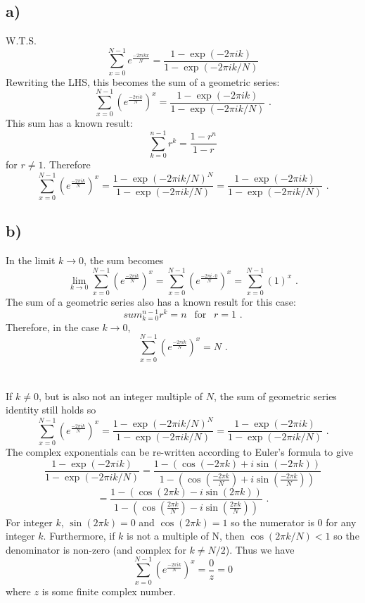 \documentclass{article}
\newcommand{\<}[1]{\left\langle #1 \right\rangle }
\begin{document}
\section{}
\subsection{a)}
W.T.S.
\[\sum_{x=0}^{N-1} e^{\frac{-2\pi i k x}{N}} = \frac{1- \exp(-2\pi ik)}{1- \exp(-2\pi i k / N)}\]
Rewriting the LHS, this becomes the sum of a geometric series:
\[\sum_{x=0}^{N-1} \left(e^{\frac{-2\pi i k}{N}}\right)^x = \frac{1- \exp(-2\pi ik)}{1- \exp(-2\pi i k / N)} \text{ .}\]
This sum has a known result:
\[\sum_{k=0}^{n-1} r^k = \frac{1 - r^n}{1 - r} \]
for $r \neq 1$. Therefore
\[\sum_{x=0}^{N-1} \left(e^{\frac{-2\pi i k}{N}}\right)^x = \frac{1- \exp(-2\pi ik/N)^N}{1- \exp(-2\pi i k / N)} = \frac{1- \exp(-2\pi ik)}{1- \exp(-2\pi i k / N)} \text{ .}\]

\subsection{b)}
In the limit $k \to 0$, the sum becomes
\[\lim_{k\to 0} \sum_{x=0}^{N-1} \left(e^{\frac{-2\pi i k}{N}}\right)^x = \sum_{x=0}^{N-1} \left(e^{\frac{-2\pi i \cdot 0}{N}}\right)^x = \sum_{x=0}^{N-1} \left(1\right)^x \text{ .}\]
The sum of a geometric series also has a known result for this case:
\[sum_{k=0}^{n-1} r^k = n \ \ \text{ for } \ \ r=1 \text{ .}\]
Therefore, in the case $k\to 0$, 
\[ \sum_{x=0}^{N-1} \left(e^{\frac{-2\pi i k}{N}}\right)^x = N \text{ .}\]\\
\\
If $k \neq 0$, but is also not an integer multiple of $N$, the sum of geometric series identity still holds so
\[\sum_{x=0}^{N-1} \left(e^{\frac{-2\pi i k}{N}}\right)^x = \frac{1- \exp(-2\pi ik/N)^N}{1- \exp(-2\pi i k / N)} = \frac{1- \exp(-2\pi ik)}{1- \exp(-2\pi i k / N)} \text{ .}\]
The complex exponentials can be re-written according to Euler's formula to give
\[\frac{1- \exp(-2\pi ik)}{1- \exp(-2\pi i k / N)} = 
\frac{1 - (\cos(-2\pi k) + i\sin(-2\pi k))}{1 - \left(\cos\left(\frac{-2\pi k}{N}\right) + i\sin\left(\frac{-2\pi k}{N}\right)\right)}\]
\[ = \frac{1 - (\cos(2\pi k) - i\sin(2\pi k))}{1 - \left(\cos\left(\frac{2\pi k}{N}\right) - i\sin\left(\frac{2\pi k}{N}\right)\right)} \text{ .}\]
For integer $k$, $\sin(2\pi k) = 0$ and $\cos(2\pi k) = 1$ so the numerator is 0 for any integer $k$. Furthermore, if $k$ is not a multiple of N, then $\cos(2\pi k/N) < 1$ so the denominator is non-zero (and complex for $k \neq N/2$). Thus we have 
\[\sum_{x=0}^{N-1} \left(e^{\frac{-2\pi i k}{N}}\right)^x = \frac{0}{z} = 0\]
where $z$ is some finite complex number.
\end{document}
